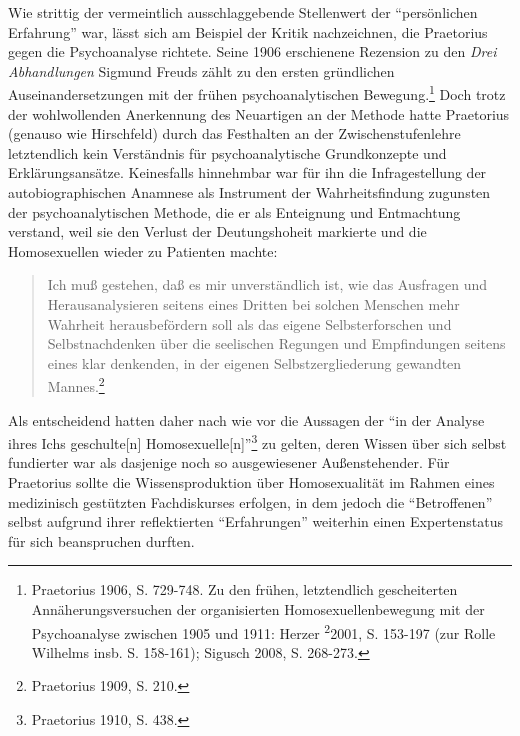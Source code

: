 \documentclass[a4paper,
fontsize=11pt,
oneside,
numbers=noperiodatend,
parskip=half-,
bibliography=totoc,
final
]{scrartcl}
\begin{document}
Wie strittig der vermeintlich ausschlaggebende Stellenwert der
\enquote{persönlichen Erfahrung} war, lässt sich am Beispiel der Kritik
nachzeichnen, die Praetorius gegen die Psychoanalyse richtete. Seine
1906 erschienene Rezension zu den \emph{Drei Abhandlungen} Sigmund
Freuds zählt zu den ersten gründlichen Auseinandersetzungen mit der
frühen psychoanalytischen Bewegung.\footnote{Praetorius 1906, S.
  729-748. Zu den frühen, letztendlich gescheiterten
  Annäherungsversuchen der organisierten Homosexuellenbewegung mit der
  Psychoanalyse zwischen 1905 und 1911: Herzer \textsuperscript{2}2001,
  S. 153-197 (zur Rolle Wilhelms insb. S. 158-161); Sigusch 2008, S.
  268-273.} Doch trotz der wohlwollenden Anerkennung des Neuartigen an
der Methode hatte Praetorius (genauso wie Hirschfeld) durch das
Festhalten an der Zwischenstufenlehre letztendlich kein Verständnis für
psychoanalytische Grundkonzepte und Erklärungsansätze. Keinesfalls
hinnehmbar war für ihn die Infragestellung der autobiographischen
Anamnese als Instrument der Wahrheitsfindung zugunsten der
psychoanalytischen Methode, die er als Enteignung und Entmachtung
verstand, weil sie den Verlust der Deutungshoheit markierte und die
Homosexuellen wieder zu Patienten machte:

\begin{quote}
Ich muß gestehen, daß es mir unverständlich ist, wie das Ausfragen und
Herausanalysieren seitens eines Dritten bei solchen Menschen mehr
Wahrheit herausbefördern soll als das eigene Selbsterforschen und
Selbstnachdenken über die seelischen Regungen und Empfindungen seitens
eines klar denkenden, in der eigenen Selbstzergliederung gewandten
Mannes.\footnote{Praetorius 1909, S. 210.}
\end{quote}

Als entscheidend hatten daher nach wie vor die Aussagen der \enquote{in
der Analyse ihres Ichs geschulte{[}n{]} Homosexuelle{[}n{]}}\footnote{Praetorius
  1910, S. 438.} zu gelten, deren Wissen über sich selbst fundierter war
als dasjenige noch so ausgewiesener Außenstehender. Für Praetorius
sollte die Wissensproduktion über Homosexualität im Rahmen eines
medizinisch gestützten Fachdiskurses erfolgen, in dem jedoch die
\enquote{Betroffenen} selbst aufgrund ihrer reflektierten
\enquote{Erfahrungen} weiterhin einen Expertenstatus für sich
beanspruchen durften.
\end{document}
